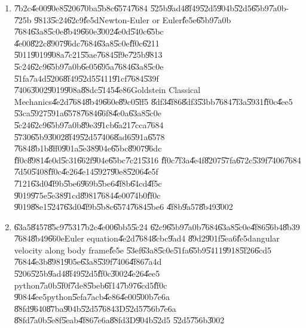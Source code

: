 \documentclass[12pt,a4paper]{article}
\begin{document}
\begin{enumerate}
\item \U{7b2c}\U{4e00}\U{90e8}\U{5206}\U{70ba}\U{5b8c}\U{6574}\U{7684}%
\U{525b}\U{9ad4}\U{8f49}\U{52d5}\U{904b}\U{52d5}\U{65b9}\U{7a0b}-\U{725b}%
\U{9813}\U{5c24}\U{62c9}\U{fe5d}Newton-Euler or Euler\U{fe5e}\U{65b9}\U{7a0b}%
\U{7684}\U{63a8}\U{5c0e}\U{8b49}\U{660e}\U{3002}\U{4e0d}\U{540c}\U{65bc}%
\U{4e00}\U{822c}\U{8907}\U{96dc}\U{7684}\U{63a8}\U{5c0e}\U{ff0c}\U{6211}%
\U{5011}\U{9019}\U{908a}\U{7c21}\U{55ae}\U{7684}\U{5f9e}\U{725b}\U{9813}%
\U{5c24}\U{62c9}\U{65b9}\U{7a0b}\U{6e05}\U{695a}\U{7684}\U{63a8}\U{5c0e}%
\U{51fa}\U{7a4d}\U{5206}\U{8f49}\U{52d5}\U{5411}\U{91cf}\U{7684}\U{539f}%
\U{7406}\U{3002}\U{9019}\U{908a}\U{88dc}\U{5145}\U{4e86}Goldstein Classical
Mechanics\cite{goldstein}\U{4e2d}\U{7684}\U{8b49}\U{660e}\U{89c0}\U{5ff5}%
\U{8df3}\U{4f86}\U{8df3}\U{53bb}\U{7684}\U{7f3a}\U{5931}\U{ff0c}\U{4ee5}%
\U{53ca}\U{5927}\U{591a}\U{6578}\U{7684}\U{66f8}\U{4e0a}\U{63a8}\U{5c0e}%
\U{5c24}\U{62c9}\U{65b9}\U{7a0b}\U{89e3}\U{91cb}\U{6a21}\U{7cca}\U{7684}%
\U{5730}\U{65b9}\U{3002}\U{8f49}\U{52d5}\U{7406}\U{8ad6}\U{591a}\U{6578}%
\U{7684}\U{8b1b}\U{8ff0}\U{901a}\U{5e38}\U{904e}\U{65bc}\U{8907}\U{96dc}%
\U{ff0c}\U{8981}\U{4e0d}\U{5c31}\U{662f}\U{904e}\U{65bc}\U{7c21}\U{5316}%
\U{ff0c}\U{7f3a}\U{4e4f}\U{8207}\U{57fa}\U{672c}\U{539f}\U{7406}\U{7684}%
\U{7d50}\U{5408}\U{ff0c}\U{4e26}\U{4e14}\U{5927}\U{90e8}\U{5206}\U{4e5f}%
\U{7121}\U{63d0}\U{4f9b}\U{5be6}\U{969b}\U{5be6}\U{4f8b}\U{64cd}\U{4f5c}%
\U{9019}\U{975e}\U{5e38}\U{91cd}\U{8981}\U{7684}\U{4e00}\U{74b0}\U{ff0c}%
\U{9019}\U{88e1}\U{5247}\U{63d0}\U{4f9b}\U{5b8c}\U{6574}\U{7684}\U{5be6}%
\U{4f8b}\U{9a57}\U{8b49}\U{3002}

\item \U{63a5}\U{8457}\U{85c9}\U{7531}\U{7b2c}\U{4e00}\U{6bb5}\U{5c24}%
\U{62c9}\U{65b9}\U{7a0b}\U{7684}\U{63a8}\U{5c0e}\U{4f86}\U{56b4}\U{8b39}%
\U{7684}\U{8b49}\U{660e}Euler equation\U{4e2d}\U{7684}\U{8cbc}\U{9ad4}%
\U{89d2}\U{901f}\U{5ea6}\U{fe5d}angular velocity along body frame\U{fe5e}%
\U{53ef}\U{63a8}\U{5c0e}\U{51fa}\U{65b9}\U{5411}\U{9918}\U{5f26}\U{6cd5}%
\U{7684}\U{4e3b}\U{8981}\U{905e}\U{63a8}\U{539f}\U{7406}\U{4f86}\U{7a4d}%
\U{5206}\U{525b}\U{9ad4}\U{8f49}\U{52d5}\U{ff0c}\U{3002}\U{4e26}\U{4ee5}%
python\U{7a0b}\U{5f0f}\U{7de8}\U{5beb}\U{6f14}\U{7b97}\U{6cd5}\U{ff0c}%
\U{9084}\U{4ee5}python\U{5efa}\U{7acb}\U{4e86}\U{4e00}\U{500b}\U{7e6a}%
\U{88fd}\U{9640}\U{87ba}\U{904b}\U{52d5}\U{7684}3D\U{52d5}\U{756b}\U{7e6a}%
\U{88fd}\U{7a0b}\U{5e8f}\U{5eab}\U{4f86}\U{7e6a}\U{88fd}3D\U{904b}\U{52d5}%
\U{52d5}\U{756b}\U{3002}


\end{enumerate}
\end{document}
